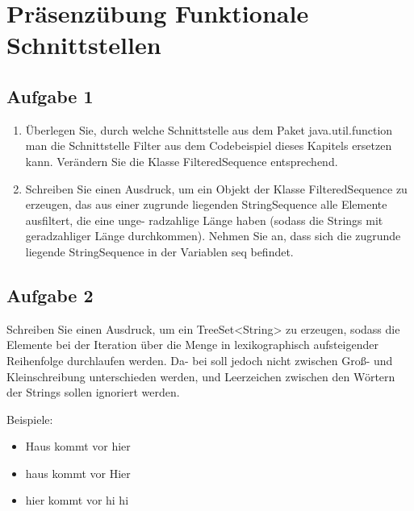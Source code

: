 \chapter{Präsenzübung Funktionale Schnittstellen}

\section{Aufgabe 1}

\begin{enumerate}
    \item Überlegen Sie, durch welche Schnittstelle aus dem Paket java.util.function man die
Schnittstelle Filter aus dem Codebeispiel dieses Kapitels ersetzen kann.
Verändern Sie die Klasse FilteredSequence entsprechend.
\item Schreiben Sie einen Ausdruck, um ein Objekt der Klasse FilteredSequence zu erzeugen,
das aus einer zugrunde liegenden StringSequence alle Elemente ausfiltert, die eine unge-
radzahlige Länge haben (sodass die Strings mit geradzahliger Länge durchkommen). Nehmen
Sie an, dass sich die zugrunde liegende StringSequence in der Variablen seq befindet.
\end{enumerate}

\section{Aufgabe 2}

Schreiben Sie einen Ausdruck, um ein TreeSet<String> zu erzeugen, sodass die Elemente bei
der Iteration über die Menge in lexikographisch aufsteigender Reihenfolge durchlaufen werden. Da-
bei soll jedoch nicht zwischen Groß- und Kleinschreibung unterschieden werden, und Leerzeichen
zwischen den Wörtern der Strings sollen ignoriert werden.

Beispiele:

\begin{itemize}
    \item Haus kommt vor hier
    \item haus kommt vor Hier
    \item hier kommt vor hi hi
\end{itemize}